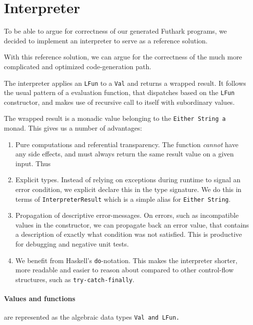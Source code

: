 \section{Interpreter}
To be able to argue for correctness of our generated Futhark programs, we
decided to implement an interpreter to serve as a reference solution.

With this reference solution, we can argue for the correctness of the much more
complicated and optimized code-generation path.

The interpreter applies an \texttt{LFun} to a \texttt{Val} and returns a wrapped
result.  It follows the usual pattern of a evaluation function, that dispatches
based on the \texttt{LFun} constructor, and makes use of recursive call to
itself with subordinary values.

The wrapped result is a monadic value belonging to the \texttt{Either String a}
monad.  This gives us a number of advantages:

\begin{enumerate}

\item Pure computations and referential transparency.
The function \textit{cannot} have any side effects, and must always
return the same result value on a given input.  Thus

\item Explicit types.  Instead of relying on exceptions during runtime to signal
an error condition, we explicit declare this in the type signature.  We do this
in terms of \texttt{InterpreterResult} which is a simple alias for \texttt{Either
String}.

\item Propagation of descriptive error-messages.  On errors, such
as incompatible values in the constructor, we can propagate back an error
value, that contains a description of exactly what condition was not satisfied.
This is productive for debugging and negative unit tests.

\item We benefit from Haskell's \texttt{do}-notation.  This makes the
interpreter shorter, more readable and easier to reason about compared to other
control-flow structures, such as \texttt{try-catch-finally}.

\end{enumerate}

\paragraph{Values and functions} are represented as the algebraic data types \tt{Val} and \tt{LFun}.

